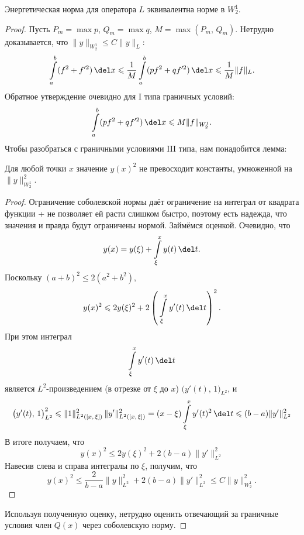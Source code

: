 \documentclass{trlnotes}
\begin{document}
    \begin{st}
        Энергетическая норма для оператора $L$ эквивалентна норме в $W_2^1$.
        \begin{proof}
            Пусть $P_m = \max p$, $Q_m = \max q$, $M = \max(P_m, \, Q_m)$. Нетрудно доказывается, что $\|y\|_{W_2^1} \leqslant C \|y\|_L$:
            \[
                \int\limits_a^b (f^2 + f'^2) \, \del x \leqslant \dfrac{1}{M} \int\limits_a^b (pf^2 + qf'^2) \, \del x \leqslant \dfrac{1}{M} \|f\|_L.
            \]
            Обратное утверждение очевидно для I типа граничных условий:
            \[
                \int\limits_a^b (pf^2 + qf'^2) \, \del x \leqslant M \|f\|_{W_2^1}.
            \]
            Чтобы разобраться с граничными условиями III типа, нам понадобится лемма:
            \begin{lm}
                Для любой точки $x$ значение $y(x)^2$ не превосходит константы, умноженной на $\|y\|_{W_2^1}^2$.
                \begin{proof}
                    Ограничение соболевской нормы даёт ограничение на интеграл от квадрата функции + не позволяет ей расти слишком быстро, поэтому есть надежда, что значения и правда будут ограничены нормой. Займёмся оценкой. Очевидно, что
                    \[
                        y(x) = y(\xi) + \int\limits_{\xi}^x y(t) \, \del t.
                    \]
                    Поскольку $(a + b)^2 \leqslant 2(a^2 + b^2)$,
                    \[
                        y(x)^2 \leqslant 2y(\xi)^2 + 2 \left(\,\int\limits_{\xi}^x y'(t) \, \del t\right)^2.
                    \]
                    При этом интеграл
                    \[
                        \int\limits_{\xi}^x y'(t) \, \del t
                    \]
                    является $L^2$-произведением (в отрезке от $\xi$ до $x$) $\big(y'(t), \, 1\big)_{L^2}$, и
                    \[
                        \big(y'(t), \, 1\big)_{L^2}^2 \leqslant \|1\|_{L^2([x, \, \xi])}^2 \,\|y'\|_{L^2([x, \, \xi])}^2 = (x - \xi) \int\limits_{\xi}^x y'(t)^2 \, \del t \leqslant (b - a)\|y'\|^2_{L^2}
                    \]
                    В итоге получаем, что
                    \[ 
                        y(x)^2 \leqslant 2y(\xi)^2 + 2(b - a) \|y'\|^2_{L^2}
                    \]
                    Навесив слева и справа интегралы по $\xi$, получим, что
                    \[
                        y(x)^2 \leqslant \dfrac{2}{b - a} \|y\|^2_{L^2} + 2(b - a) \|y'\|^2_{L^2} \leqslant C \|y\|^2_{W_2^1}.
                    \]
                \end{proof}
            \end{lm}
            Используя полученную оценку, нетрудно оценить отвечающий за граничные условия член $Q(x)$ через соболевскую норму.
        \end{proof}
    \end{st}
\end{document}
